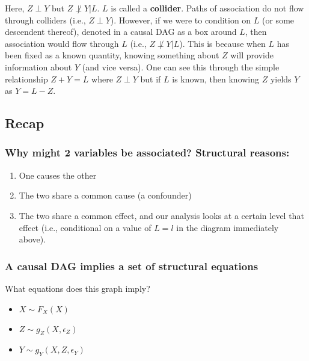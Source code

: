 Here, $Z \perp Y$ but $Z \not\perp Y | L$. $L$ is called a \textbf{collider}. Paths of association do not flow through colliders (i.e., $Z \perp Y$). However, if we were to condition on $L$ (or some descendent thereof), denoted in a causal DAG as a box around $L$, then association would flow through $L$ (i.e., $Z \not\perp Y | L$). This is because when $L$ has been fixed as a known quantity, knowing something about $Z$ will provide information about $Y$ (and vice versa). One can see this through the simple relationship $Z+Y=L$ where $Z \perp Y$ but if $L$ is known, then knowing $Z$ yields $Y$ as $Y=L-Z$.

\subsection{Recap}
\subsubsection{Why might 2 variables be associated? Structural reasons:}

\begin{enumerate}
\item One causes the other
\item The two share a common cause (a confounder)
\item The two share a common effect, and our analysis looks at a certain level that effect (i.e., conditional on a value of $L=l$ in the diagram immediately above).
\end{enumerate}

\subsubsection{A causal DAG implies a set of structural equations}

\begin{center}
\end{center}

What equations does this graph imply?
\begin{itemize}
\item $X \sim F_X(X)$
\item $Z \sim g_Z(X, \epsilon_Z)$
\item $Y \sim g_Y(X, Z, \epsilon_Y)$
\end{itemize}

